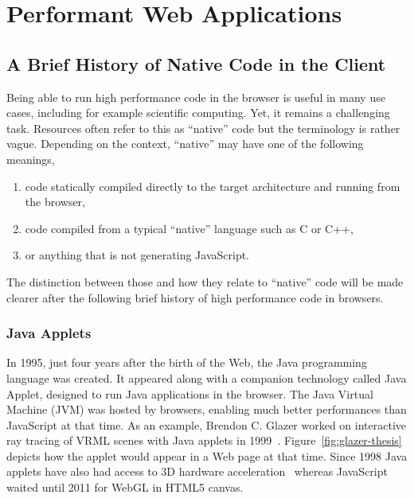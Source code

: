 \chapter{Performant Web Applications}%
\label{cha:performant_web_applications}


\minitoc%
\clearpage

\section{A Brief History of Native Code in the Client}%
\label{sec:native_client}

Being able to run high performance code in the browser
is useful in many use cases, including for example scientific computing.
Yet, it remains a challenging task.
Resources often refer to this as ``native'' code
but the terminology is rather vague.
Depending on the context, ``native'' may have one of the following meanings,
\begin{enumerate}
\setlength\itemsep{-0.5em}
	\item code statically compiled directly to the target architecture and running from the browser,
	\item code compiled from a typical ``native'' language such as C or C++,
	\item or anything that is not generating JavaScript.
\end{enumerate}
The distinction between those and how they relate to ``native'' code
will be made clearer after the following
brief history of high performance code in browsers.

\subsection{Java Applets}%
\label{sub:java_applets}

In 1995, just four years after the birth of the Web,
the Java programming language was created.
It appeared along with a companion technology called Java Applet,
designed to run Java applications in the browser.
The Java Virtual Machine (JVM) was hosted by browsers,
enabling much better performances than JavaScript at that time.
As an example, Brendon C. Glazer worked on interactive ray tracing
of VRML scenes with Java applets in 1999~\cite{Glazer1999InteractiveRT}.
Figure~\ref{fig:glazer-thesis} depicts how the applet would appear
in a Web page at that time.
Since 1998 Java applets have also had access to 3D hardware acceleration~\cite{Java3dAPISpec}
whereas JavaScript waited until 2011 for WebGL in HTML5 canvas.

